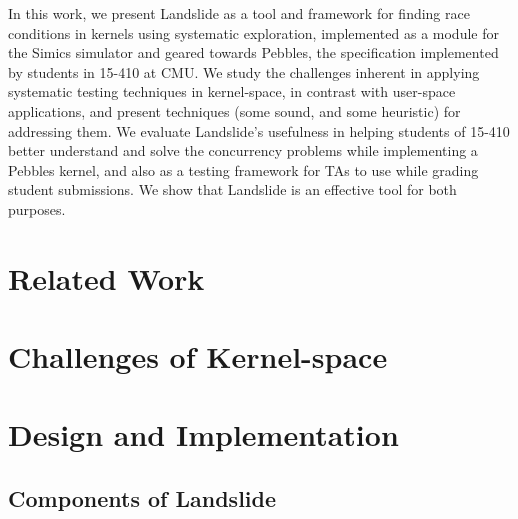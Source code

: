 \documentclass[10pt,twocolumn]{article}
\begin{document}
In this work, we present Landslide as a tool and framework for finding race conditions in kernels using systematic exploration, implemented as a module for the Simics simulator and geared towards Pebbles, the specification implemented by students in 15-410 at CMU.
We study the challenges inherent in applying systematic testing techniques in kernel-space, in contrast with user-space applications, and present techniques (some sound, and some heuristic) for addressing them.
We evaluate Landslide's usefulness in helping students of 15-410 better understand and solve the concurrency problems while implementing a Pebbles kernel, and also as a testing framework for TAs to use while grading student submissions.
We show that Landslide is an effective tool for both purposes.

\section{Related Work}

\section{Challenges of Kernel-space}

\section{Design and Implementation}
\subsection{Components of Landslide}
\end{document}
